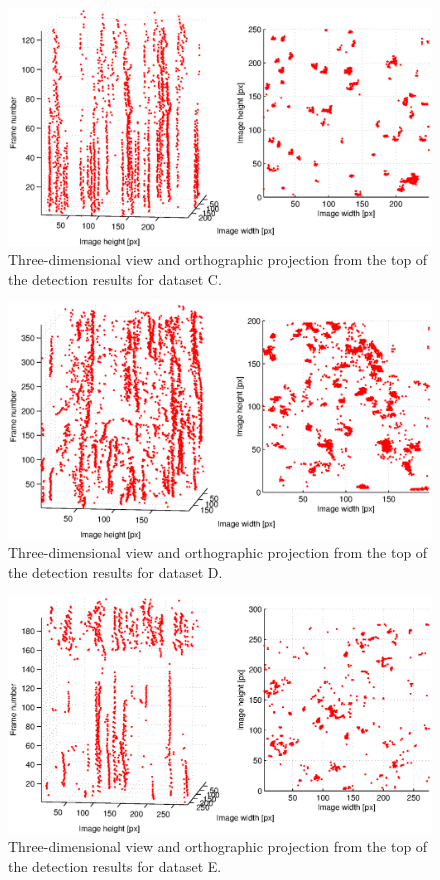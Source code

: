 \begin{figure}
	\includegraphics[width=\textwidth]{images/fig_results_detector_sequences_3}
	\caption{Three-dimensional view and orthographic projection from the top of the detection results for dataset C.}
	\label{fig:results_detector_sequences_3}
\end{figure}

\begin{figure}
	\includegraphics[width=\textwidth]{images/fig_results_detector_sequences_4}
	\caption{Three-dimensional view and orthographic projection from the top of the detection results for dataset D.}
	\label{fig:results_detector_sequences_4}
\end{figure}
\begin{figure}
	\includegraphics[width=\textwidth]{images/fig_results_detector_sequences_5}
	\caption{Three-dimensional view and orthographic projection from the top of the detection results for dataset E.}
	\label{fig:results_detector_sequences_5}
\end{figure}			